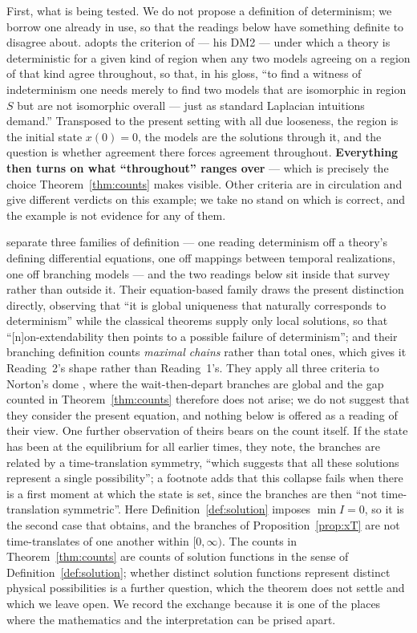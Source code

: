 \documentclass[12pt]{article}
\theoremstyle{plain}
\theoremstyle{definition}
\theoremstyle{remark}
\begin{document}
First, what is being tested. We do not propose a definition of determinism; we
borrow one already in use, so that the readings below have something definite to
disagree about. \citet[p.~2]{Doboszewski} adopts the criterion of
\citet{Butterfield} --- his DM2 --- under which a theory is deterministic for a
given kind of region when any two models agreeing on a region of that kind agree
throughout, so that, in his gloss, ``to find a witness of indeterminism one
needs merely to find two models that are isomorphic in region $S$ but are not
isomorphic overall --- just as standard Laplacian intuitions demand.''
Transposed to the present setting with all due looseness, the region is the
initial state $x(0)=0$, the models are the solutions through it, and the
question is whether agreement there forces agreement throughout.
\textbf{Everything then turns on what ``throughout'' ranges over} --- which is
precisely the choice Theorem~\ref{thm:counts} makes visible. Other criteria are
in circulation and give different verdicts on this example; we take no stand on
which is correct, and the example is not evidence for any of them.

\citet{MullerPlacek} separate three families of definition ---
one reading determinism off a theory's defining differential equations, one off
mappings between temporal realizations, one off branching models --- and the two
readings below sit inside that survey rather than outside it. Their
equation-based family draws the present distinction directly, observing that
``it is global uniqueness that naturally corresponds to determinism'' while the
classical theorems supply only local solutions, so that ``[n]on-extendability
then points to a possible failure of determinism''; and their branching
definition counts \emph{maximal chains} rather than total ones, which gives it
Reading~2's shape rather than Reading~1's. They apply all three criteria to
Norton's dome \citep{Norton}, where the wait-then-depart branches are global and
the gap counted in Theorem~\ref{thm:counts} therefore does not arise; we do not
suggest that they consider the present equation, and nothing below is offered as
a reading of their view. One further observation of theirs bears on the count
itself. If the state has been at the equilibrium for all earlier times, they
note, the branches are related by a time-translation symmetry, ``which suggests
that all these solutions represent a single possibility''; a footnote adds that
this collapse fails when there is a first moment at which the state is set,
since the branches are then ``not time-translation symmetric''. Here
Definition~\ref{def:solution} imposes $\min I=0$, so it is the second case that
obtains, and the branches of Proposition~\ref{prop:xT} are not time-translates
of one another within $[0,\infty)$. The counts in Theorem~\ref{thm:counts} are
counts of solution functions in the sense of Definition~\ref{def:solution};
whether distinct solution functions represent distinct physical possibilities is
a further question, which the theorem does not settle and which we leave open.
We record the exchange because it is one of the places where the mathematics and
the interpretation can be prised apart.
\end{document}
